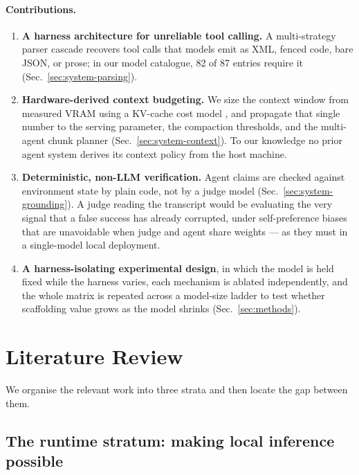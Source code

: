 \documentclass[11pt,a4paper]{article}
\begin{document}
\paragraph{Contributions.}
\begin{enumerate}
  \item \textbf{A harness architecture for unreliable tool calling.} A
    multi-strategy parser cascade recovers tool calls that models emit as XML,
    fenced code, bare JSON, or prose; in our model catalogue, 82 of 87 entries
    require it (Sec.~\ref{sec:system-parsing}).
  \item \textbf{Hardware-derived context budgeting.} We size the context window
    from measured VRAM using a KV-cache cost model
    \citep{kwon2023pagedattention,ainslie2023gqa}, and propagate that single
    number to the serving parameter, the compaction thresholds, and the
    multi-agent chunk planner (Sec.~\ref{sec:system-context}). To our knowledge
    no prior agent system derives its context policy from the host machine.
  \item \textbf{Deterministic, non-LLM verification.} Agent claims are checked
    against environment state by plain code, not by a judge model
    (Sec.~\ref{sec:system-grounding}). A judge reading the transcript would be
    evaluating the very signal that a false success has already corrupted, under
    self-preference biases that are unavoidable when judge and agent share
    weights \citep{panickssery2024llmevaluators} --- as they must in a
    single-model local deployment.
  \item \textbf{A harness-isolating experimental design}, in which the model is
    held fixed while the harness varies, each mechanism is ablated
    independently, and the whole matrix is repeated across a model-size ladder
    to test whether scaffolding value grows as the model shrinks
    (Sec.~\ref{sec:methods}).
\end{enumerate}

\section{Literature Review}
\label{sec:related}

We organise the relevant work into three strata and then locate the gap between
them.

\subsection{The runtime stratum: making local inference possible}
\end{document}
